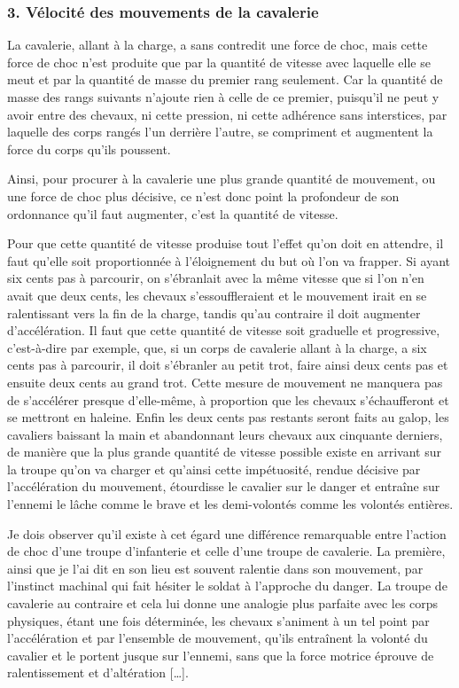 \documentclass[french,twoside]{book} %
\begin{document}
\subsubsection[{3. Vélocité des mouvements de la cavalerie}]{3. Vélocité des mouvements de la cavalerie}
\noindent La cavalerie, allant à la charge, a sans contredit une force de choc, mais cette force de choc n’est produite que par la quantité de vitesse avec laquelle elle se meut et par la quantité de masse du premier rang seulement. Car la quantité de masse des rangs suivants n’ajoute rien à celle de ce premier, puisqu’il ne peut y avoir entre des chevaux, ni cette pression, ni cette adhérence sans interstices, par laquelle des corps rangés l’un derrière l’autre, se compriment et augmentent la force du corps qu’ils poussent.\par
Ainsi, pour procurer à la cavalerie une plus grande quantité de mouvement, ou une force de choc plus décisive, ce n’est donc point la profondeur de son ordonnance qu’il faut augmenter, c’est la quantité de vitesse.\par
Pour que cette quantité de vitesse produise tout l’effet qu’on doit en attendre, il faut qu’elle soit proportionnée à l’éloignement du but où l’on va frapper. Si ayant six cents pas à parcourir, on s’ébranlait avec la même vitesse que si l’on n’en avait que deux cents, les chevaux s’essouffleraient et le mouvement irait en se ralentissant vers la fin de la charge, tandis qu’au contraire il doit augmenter d’accélération. Il faut que cette quantité de vitesse soit graduelle et progressive, c’est-à-dire par exemple, que, si un corps de cavalerie allant à la charge, a six cents pas à parcourir, il doit s’ébranler au petit trot, faire ainsi deux cents pas et ensuite deux cents au grand trot. Cette mesure de mouvement ne manquera pas de s’accélérer presque d’elle-même, à proportion que les chevaux s’échaufferont et se mettront en haleine. Enfin les deux cents pas restants seront faits au galop, les cavaliers baissant la main et abandonnant leurs chevaux aux cinquante derniers, de manière que la plus grande quantité de vitesse possible existe en arrivant sur la troupe qu’on va charger et qu’ainsi cette impétuosité, rendue décisive par l’accélération du mouvement, étourdisse le cavalier sur le danger et entraîne sur l’ennemi le lâche comme le brave et les demi-volontés comme les volontés entières.\par
Je dois observer qu’il existe à cet égard une différence remarquable entre l’action de choc d’une troupe d’infanterie et celle d’une troupe de cavalerie. La première, ainsi que je l’ai dit en son lieu est souvent ralentie dans son mouvement, par l’instinct machinal qui fait hésiter le soldat à l’approche du danger. La troupe de cavalerie au contraire et cela lui donne une analogie plus parfaite avec les corps physiques, étant une fois déterminée, les chevaux s’animent à un tel point par l’accélération et par l’ensemble de mouvement, qu’ils entraînent la volonté du cavalier et le portent jusque sur l’ennemi, sans que la force motrice éprouve de ralentissement et d’altération […].\par
\end{document}
